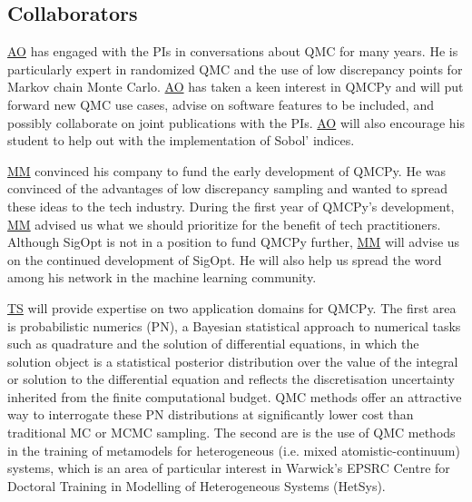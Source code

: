 \documentclass[11pt]{NSFamsart}
\newcommand{\AO}{\hyperlink{AOlink}{AO}\xspace}
\newcommand{\MM}{\hyperlink{MMlink}{MM}\xspace}
\newcommand{\TS}{\hyperlink{TSlink}{TS}\xspace}
\begin{document}
\subsection{Collaborators}
\AO has engaged with the PIs in conversations about QMC for many years.  He is particularly expert in randomized QMC and the use of low discrepancy points for Markov chain Monte Carlo.  \AO has taken a keen interest in QMCPy and will put forward new QMC use cases, advise on software features to be included, and possibly collaborate on joint publications with the PIs.  \AO will also encourage his student to help out with the implementation of Sobol' indices.

\MM convinced his company to fund the early development of QMCPy.  He was convinced of the advantages of low discrepancy sampling and wanted to spread these ideas to the tech industry.  During the first year of QMCPy's development, \MM advised us what we should prioritize for the benefit of tech practitioners.  Although SigOpt is not in a position to  fund QMCPy further, \MM will advise us on the continued development of SigOpt.  He will also help us spread the word among his network in the machine learning community.

\TS will provide expertise on two application domains for QMCPy.  The first area is probabilistic numerics (PN), a Bayesian statistical approach to numerical tasks such as quadrature and the solution of differential equations, in which the solution object is a statistical posterior distribution over the value of the integral or solution to the differential equation and reflects the discretisation uncertainty inherited from the finite computational budget.  QMC methods offer an attractive way to interrogate these PN distributions at significantly lower cost than traditional MC or MCMC sampling.  The second are is the use of QMC methods in the training of metamodels for heterogeneous (i.e. mixed atomistic-continuum) systems, which is an area of particular interest in Warwick's EPSRC Centre for Doctoral Training in Modelling of Heterogeneous Systems (HetSys).




\newpage
\clearpage
\setcounter{page}{1}




{\renewcommand\addcontentsline[3]{} 
\renewcommand{\refname}{{\Large\textbf{References Cited}}}                   %
\renewcommand{\bibliofont}{\normalsize}

}
\end{document}
